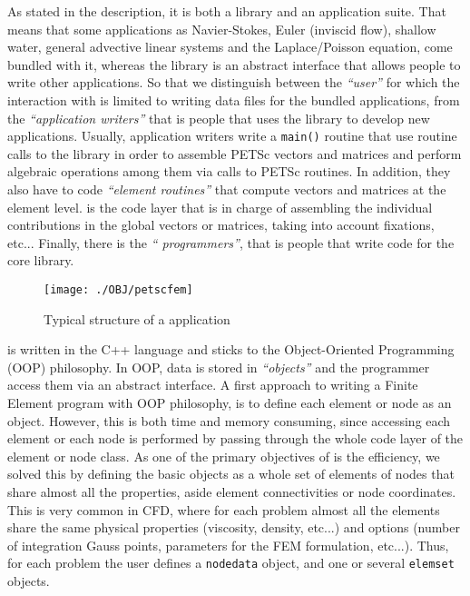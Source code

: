 

%
As stated in the \pfem{} description, it is both a library and an
application suite. That means that some applications as Navier-Stokes,
Euler (inviscid flow), shallow water, general advective linear systems
and the Laplace/Poisson equation, come bundled with it, whereas the
library is an abstract interface that allows people to write other
applications. So that we distinguish between the \emph{``user''} for
which the interaction with \pfem{} is limited to writing data files
for the bundled applications, from the \emph{``application writers''}
that is people that uses the library to develop new
applications. Usually, application writers write a \verb+main()+
routine that use routine calls to the \pfem{} library in order to
assemble PETSc vectors and matrices and perform algebraic operations
among them via calls to PETSc routines.  In addition, they also have
to code \emph{``element routines''} that compute vectors and matrices
at the element level. \pfem{} is the code layer that is in charge of
assembling the individual contributions in the global vectors or
matrices, taking into account fixations, etc...  Finally, there is the
\emph{``\pfem{} programmers''}, that is people that write code for the
core library.

\begin{figure*}[htb]
\centerline{\texttt{[image: ./OBJ/petscfem]}}
\caption{Typical structure of a \pfem{} application}
\label{fg:petscfem}
\end{figure*}


\pfem{} is written in the C++ language and sticks to the
Object-Oriented Programming (OOP) philosophy. In OOP, data is stored
in \emph{``objects''} and the programmer access them via an abstract
interface. A first approach to writing a Finite Element program with
OOP philosophy, is to define each element or node as an
object. However, this is both time and memory consuming, since
accessing each element or each node is performed by passing through
the whole code layer of the element or node class. As one of the
primary objectives of \pfem{} is the efficiency, we solved this by
defining the basic objects as a whole set of elements of nodes that
share almost all the properties, aside element connectivities or node
coordinates. This is very common in CFD, where for each problem almost
all the elements share the same physical properties (viscosity,
density, etc...) and options (number of integration Gauss points,
parameters for the FEM formulation, etc...). Thus, for each problem
the user defines a \verb+nodedata+ object, and one or several
\verb+elemset+ objects. 

